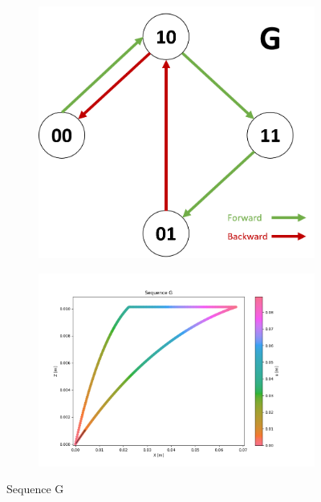        \begin{figure}[h]
            \begin{subfigure}{.3\textwidth}
            \includegraphics[width=\textwidth]{images/S_G.png}
            \end{subfigure}%
            \begin{subfigure}{.7\textwidth}
            \includegraphics[width=\textwidth]{images/G.png}
            \end{subfigure}
            \caption{Sequence G}
        \end{figure}
